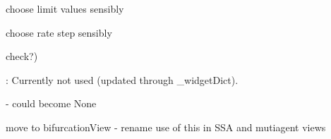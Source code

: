 \begin{DoxyRefList}
choose limit values sensibly 

choose rate step sensibly  
\item[\label{todo__todo000027}%
\Hypertarget{todo__todo000027}%
Global \hyperlink{class_mu_mo_t_1_1_mu_mo_tmulti_controller_a27dd8543b5188cdfe40f622d267fe2c5}{Mu\+Mo\+Tmulti\+Controller.\+\_\+view} ]check?)  
\item[\label{todo__todo000049}%
\Hypertarget{todo__todo000049}%
Global \hyperlink{class_mu_mo_t_1_1_mu_mo_t_s_s_a_view_a5feff4ca83ee97d6e09874496a4975d4}{Mu\+Mo\+T\+S\+S\+A\+View.\+\_\+plot\+Type} ]\+: Currently not used (updated through \+\_\+widget\+Dict). 
\item[\label{todo__todo000022}%
\Hypertarget{todo__todo000022}%
Global \hyperlink{class_mu_mo_t_1_1_mu_mo_tview_a15f56ca9811d1e67d721fa64f9b0dc1e}{Mu\+Mo\+Tview.\+\_\+controller} ]-\/ could become None  
\item[\label{todo__todo000023}%
\Hypertarget{todo__todo000023}%
Global \hyperlink{class_mu_mo_t_1_1_mu_mo_tview_a5feff4ca83ee97d6e09874496a4975d4}{Mu\+Mo\+Tview.\+\_\+plot\+Type} ]move to bifurcation\+View -\/ rename use of this in S\+SA and mutiagent views 
\end{DoxyRefList}